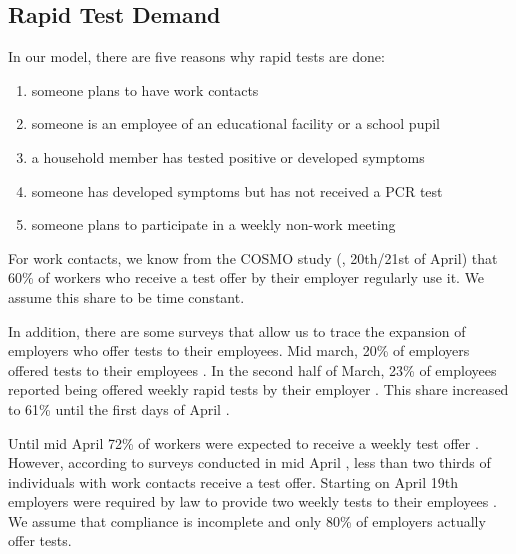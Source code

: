 \subsection{Rapid Test Demand}
\label{subsec:rapid_test_demand}

In our model, there are five reasons why rapid tests are done:

\begin{enumerate}
    \item someone plans to have work contacts
    \item someone is an employee of an educational facility or a school pupil
    \item a household member has tested positive or developed symptoms
    \item someone has developed symptoms but has not received a PCR test
    \item someone plans to participate in a weekly non-work meeting
\end{enumerate}


For work contacts, we know from the COSMO study (\cite{Betsch2021}, 20th/21st of April)
that 60\% of workers who receive a test offer by their employer regularly use it. We
assume this share to be time constant.

In addition, there are some surveys that allow us to trace the expansion of employers who
offer tests to their employees. Mid march, 20\% of employers offered tests to their
employees \citep{DIHK2021}. In the second half of March, 23\% of employees reported being
offered weekly rapid tests by their employer \citep{Ahlers2021}. This share increased to
61\% until the first days of April \citep{BMWI2021, IZA2021}.

Until mid April 72\% of workers were expected to receive a weekly test offer
\citep{BMWI2021, IZA2021}. However, according to surveys conducted in mid April
\citep{Betsch2021}, less than two thirds of individuals with work contacts receive a test
offer. Starting on April 19th employers were required by law to provide two weekly tests
to their employees \citep{Bundesanzeiger2021}. We assume that compliance is incomplete
and only 80\% of employers actually offer tests.

